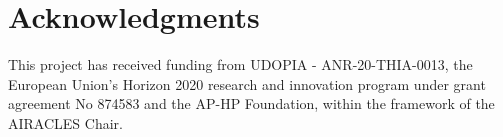 \documentclass[
]{jss}
\begin{document}
\section*{Acknowledgments}\label{acknowledgments}

This project has received funding from UDOPIA - ANR-20-THIA-0013, the
European Union's Horizon 2020 research and innovation program under
grant agreement No 874583 and the AP-HP Foundation, within the framework
of the AIRACLES Chair.

\renewcommand\refname{References}

\end{document}
